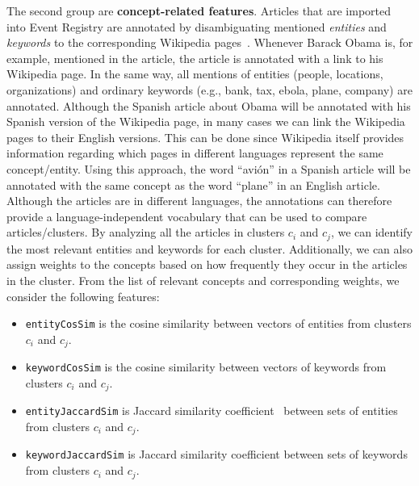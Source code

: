 \documentclass[twoside,11pt]{article}
\begin{document}
The second group are {\bf concept-related features}. Articles that are imported into Event Registry are annotated by disambiguating mentioned \emph{entities} and \emph{keywords} to the corresponding Wikipedia pages~\cite{zhang2014}. Whenever Barack Obama is, for example, mentioned in the article, the article is annotated with a link to his Wikipedia page. In the same way, all mentions of entities (people, locations, organizations) and ordinary keywords (e.g., bank, tax, ebola, plane, company) are annotated. Although the Spanish article about Obama will be annotated with his Spanish version of the Wikipedia page, in many cases we can link the Wikipedia pages to their English versions. This can be done since Wikipedia itself provides information regarding which pages in different languages represent the same concept/entity. Using this approach, the word ``avi\'on'' in a Spanish article will be annotated with the same concept as the word ``plane'' in an English article. Although the articles are in different languages, the annotations can therefore provide a language-independent vocabulary that can be used to compare articles/clusters. By analyzing all the articles in clusters $c_i$ and $c_j$, we can identify the most relevant entities and keywords for each cluster. Additionally, we can also assign weights to the concepts based on how frequently they occur in the articles in the cluster. From the list of relevant concepts and corresponding weights, we consider the following features:

\begin{itemize}
\item \texttt{entityCosSim} is the cosine similarity between vectors of entities from clusters $c_i$ and $c_j$.
\item \texttt{keywordCosSim} is the cosine similarity between vectors of keywords from clusters $c_i$ and $c_j$.
\item \texttt{entityJaccardSim} is  Jaccard similarity coefficient~\cite{levandowsky1971} between sets of entities from clusters $c_i$ and $c_j$.
\item \texttt{keywordJaccardSim} is  Jaccard similarity coefficient between sets of keywords from clusters $c_i$ and $c_j$.
\end{itemize}
\end{document}
